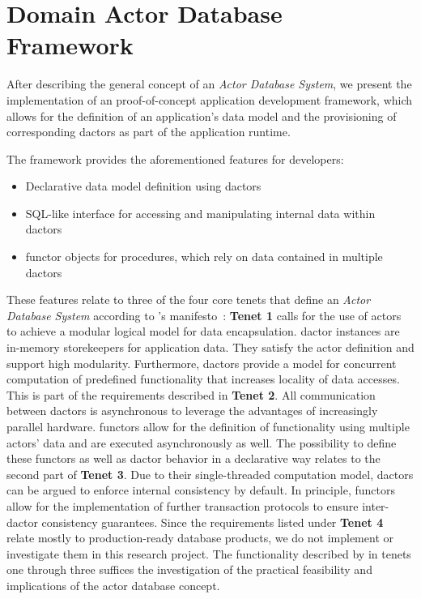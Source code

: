 
\section{Domain Actor Database Framework}\label{sec:framework}

After describing the general concept of an \textit{Actor Database System}, we present the implementation of an proof-of-concept application development framework, which allows for the definition of an application's data model and the provisioning of corresponding \glspl{dactor} as part of the application runtime.

The framework provides the aforementioned features for developers:
\begin{itemize}
  \item Declarative data model definition using \glspl{dactor}
  \item SQL-like interface for accessing and manipulating internal data within \glspl{dactor}
  \item \Gls{functor} objects for procedures, which rely on data contained in multiple \glspl{dactor}
\end{itemize}

These features relate to three of the four core tenets that define an \textit{Actor Database System} according to \citeauthor{manifesto}'s manifesto~\cite{manifesto}:
\textbf{Tenet 1} calls for the use of actors to achieve a modular logical model for data encapsulation.
\Gls{dactor} instances are in-memory storekeepers for application data.
They satisfy the actor definition and support high modularity.
Furthermore, \glspl{dactor} provide a model for concurrent computation of predefined functionality that increases locality of data accesses.
This is part of the requirements described in \textbf{Tenet 2}.
All communication between \glspl{dactor} is asynchronous to leverage the advantages of increasingly parallel hardware.
\Glspl{functor} allow for the definition of functionality using multiple actors' data and are executed asynchronously as well.
The possibility to define these \glspl{functor} as well as \gls{dactor} behavior in a declarative way relates to the second part of \textbf{Tenet 3}.
Due to their single-threaded computation model, \glspl{dactor} can be argued to enforce internal consistency by default.
In principle, \glspl{functor} allow for the implementation of further transaction protocols to ensure inter-\gls{dactor} consistency guarantees.
Since the requirements listed under \textbf{Tenet 4} relate mostly to production-ready database products, we do not implement or investigate them in this research project.
The functionality described by \citeauthor{manifesto} in tenets one through three suffices the investigation of the practical feasibility and implications of the actor database concept.

